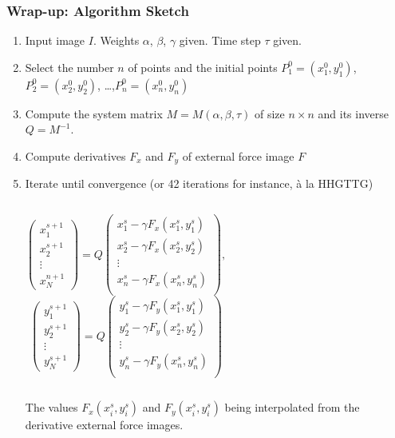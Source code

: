 \documentclass[10pt]{beamer}
\begin{document}
\begin{frame}
  \frametitle{Wrap-up: Algorithm Sketch}
  \begin{enumerate}
  \item Input image $I$. Weights $\alpha$, $\beta$, $\gamma$ given. Time step $\tau$ given.
  \item Select the number $n$ of points and the initial points $P_1^0 = (x_1^0,y_1^0)$, 
    $P_2^0 = (x_2^0,y_2^0)$, \dots ,$P_n^0 = (x_n^0,y_n^0)$  
  \item Compute the system matrix $M = M(\alpha,\beta,\tau)$ of size $n\times n$ and its
    inverse $Q = M^{-1}$.
  \item Compute derivatives $F_x$ and $F_y$ of external force image $F$
  \item Iterate until convergence (or 42 iterations for instance, \`a la HHGTTG)
    \begin{columns}
      {\small $$
        \begin{pmatrix}
          x^{s+1}_1\\x^{s+1}_2\\\vdots\\x^{n+1}_N
        \end{pmatrix} = 
        Q \begin{pmatrix}
          x^{s}_1 - \gamma F_x(x_1^{s},y_1^{s})\\
          x^{s}_2 - \gamma F_x(x_2^{s},y_2^{s})\\
          \vdots\\
          x^{s}_n - \gamma F_x(x_n^{s},y_n^{s})\\
        \end{pmatrix},
        $$}
        {\small $$ 
        \begin{pmatrix}
          y^{s+1}_1\\y^{s+1}_2\\\vdots\\y^{s+1}_N
        \end{pmatrix}
        = Q \begin{pmatrix}
          y^{s}_1 - \gamma F_y(x_1^{s},y_1^{s})\\
          y^{s}_2 - \gamma F_y(x_2^{s},y_2^{s})\\
          \vdots\\
          y^{s}_n - \gamma F_y(x_n^{s},y_n^{s})\\
        \end{pmatrix}
        $$}
    \end{columns}
    The values $F_x(x_i^s,y_i^s)$ and $F_y(x_i^s,y_i^s)$ being interpolated from the
    derivative external force images.
  \end{enumerate}
\end{frame}
\end{document}
